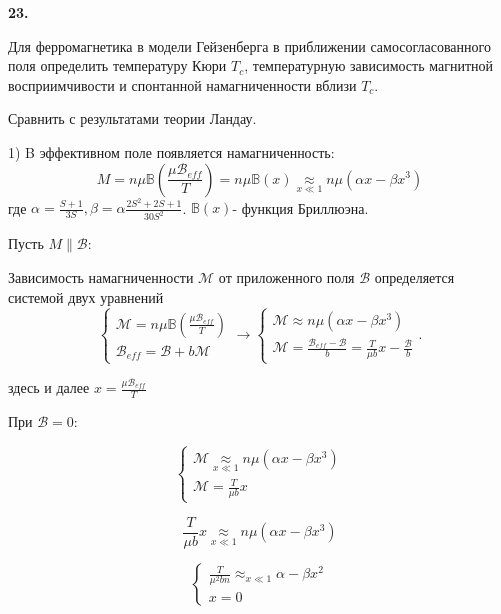 \documentclass[a4paper,12pt]{article} %
\begin{document}
\begin{ttask} \textbf{23.} 


Для ферромагнетика в модели Гейзенберга 
в приближении самосогласованного поля определить температуру Кюри $T_c$, 
температурную зависимость магнитной восприимчивости  и спонтанной намагниченности вблизи $ T_c $. 

Сравнить с результатами теории Ландау.




1) B эффективном поле появляется намагниченность:
$$
M=n \mu \mathbb{B}\left(\frac{\mu \mathcal{B}_{e f f}}{T}\right)=n \mu \mathbb{B}(x) \underset{x \ll 1}{\approx} n \mu\left(\alpha x-\beta x^{3}\right)
$$
где $\alpha=\frac{S+1}{3 S}, \beta=\alpha \frac{2 S^{2}+2 S+1}{30 S^{2}}$.
$ \mathbb{B}(x)$- функция Бриллюэна.



Пусть $M \| \mathcal{B}:$

Зависимость намагниченности $ \mathcal{M} $ от приложенного поля $ \mathcal{B} $ определяется системой двух уравнений
$$
\left\{\begin{array}{l}
	\mathcal{M}=n \mu \mathbb{B}\left(\frac{\mu \mathcal{B}_{e f f}}{T}\right) \\
	\mathcal{B}_{e f f}=\mathcal{B}+b \mathcal{M}
\end{array} \rightarrow\left\{\begin{array}{l}
	\mathcal{M} \approx n \mu\left(\alpha x-\beta x^{3}\right) \\
	\mathcal{M}=\frac{\mathcal{B}_{e f f}-\mathcal{B}}{b}=\frac{T}{\mu b} x-\frac{\mathcal{B}}{b}
\end{array} .\right.\right.
$$



здесь и далее $ x= \frac{\mu \mathcal{B}_{e f f}}{T} $

При $\mathcal{B}=0:$


$$
\left\{\begin{array}{l}
	\mathcal{M} 
	\underset{x \ll 1}{\approx}
	n \mu\left(\alpha x-\beta x^{3}\right) 
	\\
	\mathcal{M}=\frac{T}{\mu b} x
\end{array}\right.
$$

$$
\frac{T}{\mu b} x \underset{x \ll 1}{\approx} n \mu\left(\alpha x-\beta x^{3}\right)
$$



$$
\left\{\begin{array}{l}
	\frac{T}{\mu^{2} b n} \approx_{x \ll 1} \alpha-\beta x^{2} \\
	x=0
\end{array}\right.
$$




\end{ttask}
\end{document}
